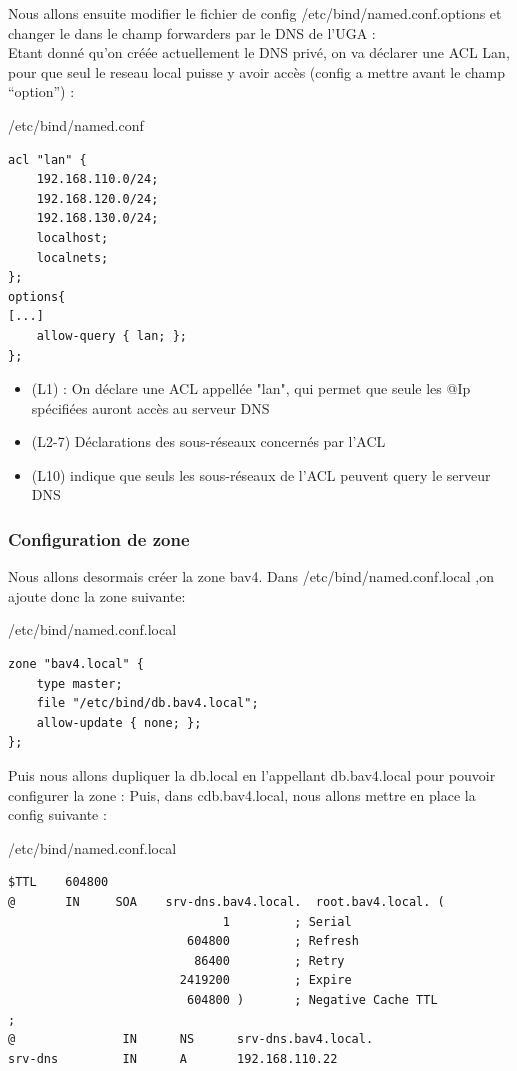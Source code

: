 \documentclass{article}
\begin{document}
Nous allons ensuite modifier le fichier de config /etc/bind/named.conf.options
et changer le  dans le champ forwarders par le DNS de l'UGA : \\
Etant donné qu'on créée actuellement le DNS privé, on va déclarer une ACL Lan, pour que seul le reseau local puisse y avoir accès (config a mettre avant le champ “option”) :
\begin{configbox}{/etc/bind/named.conf}
\begin{lstlisting}
acl "lan" {
	192.168.110.0/24;
	192.168.120.0/24;
	192.168.130.0/24;
	localhost;
	localnets;
};
options{ 
[...] 
	allow-query { lan; }; 
};
\end{lstlisting}
\end{configbox}

\begin{itemize}
	\item (L1)  : On déclare une ACL appellée "lan", qui permet que seule les @Ip spécifiées auront accès au serveur DNS
	\item (L2-7) Déclarations des sous-réseaux concernés par l'ACL
	\item (L10)  indique que seuls les sous-réseaux de l'ACL peuvent query le serveur DNS
\end{itemize}

\subsubsection{Configuration de zone}
Nous allons desormais créer la zone bav4. Dans /etc/bind/named.conf.local ,on ajoute donc la zone suivante:

\begin{configbox}{/etc/bind/named.conf.local}
\begin{lstlisting}
zone "bav4.local" {
    type master;
    file "/etc/bind/db.bav4.local";
    allow-update { none; };
};
\end{lstlisting}
\end{configbox}
Puis nous allons dupliquer la db.local en l’appellant db.bav4.local pour pouvoir configurer la zone : 
Puis, dans cdb.bav4.local, nous allons mettre en place la config suivante :

\begin{configbox}{/etc/bind/named.conf.local}
\begin{lstlisting}
$TTL    604800
@       IN     SOA    srv-dns.bav4.local.  root.bav4.local. (
                              1         ; Serial
                         604800         ; Refresh
                          86400         ; Retry
                        2419200         ; Expire
                         604800 )       ; Negative Cache TTL
;
@               IN      NS      srv-dns.bav4.local.
srv-dns         IN      A       192.168.110.22
\end{lstlisting}
\end{configbox}
\end{document}
